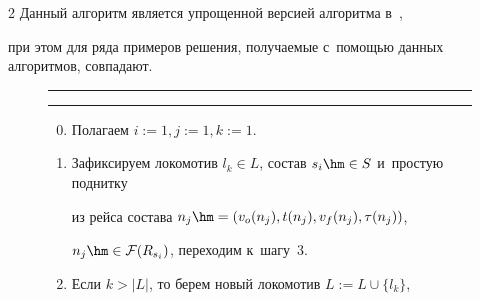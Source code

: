 \begin{multicols}{2}
Данный алгоритм является упрощенной версией алгоритма в~\cite{AzanovBuyanov},


при этом для ряда примеров решения, получаемые с~по\-мощью данных алгоритмов, совпадают.


    


\renewcommand{\figurename}{\protect\bf Алгоритм}





\begin{figure} 


\hrule





\vspace*{-4pt}





\Caption{\ }  





\vspace*{3pt}  


\hrule





\vspace*{2pt}


        \begin{enumerate}[1.]


        \setcounter{enumi}{-1}


        


        \item


        Полагаем $i:=1, j:=1, k:=1$.


        


        \item


        Зафиксируем локомотив $l_k \in L$, состав $s_i \hm\in S$ и~простую поднитку 


        из рейса состава $n_j \hm= (v_o(n_j), t(n_j), v_f(n_j), \tau(n_j))$, 


        $n_j \hm\in \mathcal F(R_{s_i})$, переходим к~шагу~3.


        


        \item


        Если $k > |L|$, то берем новый локомотив $L:=L \cup \{l_k\}$, 



\end{enumerate}
\end{figure}
\end{multicols}
